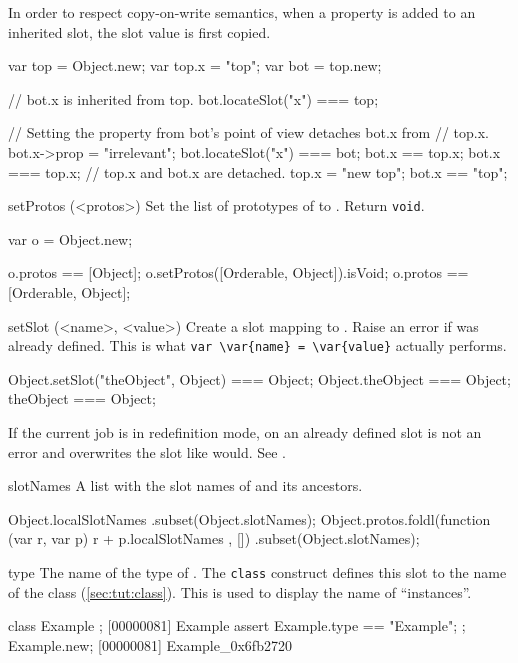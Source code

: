 \begin{urbiscriptapi}
  In order to respect copy-on-write semantics, when a property is added to
  an inherited slot, the slot value is first copied.

\begin{urbiassert}
var top = Object.new;
var top.x = "top";
var bot = top.new;

// bot.x is inherited from top.
bot.locateSlot("x") === top;

// Setting the property from bot's point of view detaches bot.x from
// top.x.
bot.x->prop = "irrelevant";
bot.locateSlot("x") === bot;
bot.x  == top.x;
bot.x === top.x;
// top.x and bot.x are detached.
top.x  = "new top";
bot.x == "top";
\end{urbiassert}

\item[setProtos](<protos>)%
  Set the list of prototypes of \this to .  Return
  \lstinline|void|.
\begin{urbiassert}
var o = Object.new;

o.protos == [Object];
o.setProtos([Orderable, Object]).isVoid;
o.protos == [Orderable, Object];
\end{urbiassert}

\item[setSlot](<name>, <value>)%
  Create a slot  mapping to . Raise an error if
   was already defined.  This is what
  \lstinline|var \var{name} = \var{value}| actually performs.
\begin{urbiassert}
Object.setSlot("theObject", Object) === Object;
Object.theObject === Object;
theObject === Object;
\end{urbiassert}

If the current job is in redefinition mode,  on an already
defined slot is not an error and overwrites the slot like
 would. See .

\item[slotNames]%
  A list with the slot names of \this and its ancestors.
\begin{urbiassert}
Object.localSlotNames
  .subset(Object.slotNames);
Object.protos.foldl(function (var r, var p) { r + p.localSlotNames },
                    [])
  .subset(Object.slotNames);
\end{urbiassert}

\item[type]%
  The name of the type of \this.  The \lstinline|class|
  construct defines this slot to the name of the class
  (\autoref{sec:tut:class}).  This is used to display the name of
  ``instances''.
\begin{urbiscript}
class Example {};
[00000081] Example
assert
{
  Example.type == "Example";
};
Example.new;
[00000081] Example_0x6fb2720
\end{urbiscript}


\end{urbiscriptapi}
